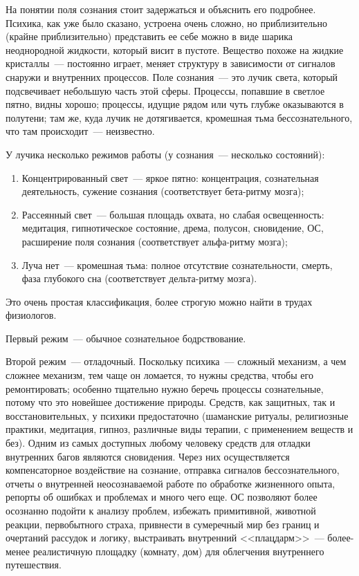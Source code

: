 \documentclass[a4paper,14pt,oneside]{memoir}
\begin{document}
На понятии поля сознания стоит задержаться и объяснить его подробнее. Психика, как уже было сказано, устроена очень сложно, но приблизительно (крайне приблизительно) представить ее себе можно в виде шарика неоднородной жидкости, который висит в пустоте. Вещество похоже на жидкие кристаллы~--- постоянно играет, меняет структуру в зависимости от сигналов снаружи и внутренних процессов. Поле сознания~--- это лучик света, который подсвечивает небольшую часть этой сферы. Процессы, попавшие в светлое пятно, видны хорошо; процессы, идущие рядом или чуть глубже оказываются в полутени; там же, куда лучик не дотягивается, кромешная тьма бессознательного, что там происходит~--- неизвестно.

У лучика несколько режимов работы (у сознания~--- несколько состояний):

\begin{enumerate}
\item Концентрированный свет~--- яркое пятно: концентрация, сознательная деятельность, сужение сознания (соответствует бета-ритму мозга);
\item Рассеянный свет~--- большая площадь охвата, но слабая освещенность: медитация, гипнотическое состояние, дрема, полусон, сновидение, ОС, расширение поля сознания (соответствует альфа-ритму мозга);
\item Луча нет~--- кромешная тьма: полное отсутствие сознательности, смерть, фаза глубокого сна (соответствует дельта-ритму мозга).
\end{enumerate}

Это очень простая классификация, более строгую можно найти в трудах физиологов.

Первый режим~--- обычное сознательное бодрствование.

Второй режим~--- отладочный. Поскольку психика~--- сложный механизм, а чем сложнее механизм, тем чаще он ломается, то нужны средства, чтобы его ремонтировать; особенно тщательно нужно беречь процессы сознательные, потому что это новейшее достижение природы. Средств, как защитных, так и восстановительных, у психики предостаточно (шаманские ритуалы, религиозные практики, медитация, гипноз, различные виды терапии, с применением веществ и без). Одним из самых доступных любому человеку средств для отладки внутренних багов являются сновидения. Через них осуществляется компенсаторное воздействие на сознание, отправка сигналов бессознательного, отчеты о внутренней неосознаваемой работе по обработке жизненного опыта, репорты об ошибках и проблемах и много чего еще. ОС позволяют более осознанно подойти к анализу проблем, избежать примитивной, животной реакции, первобытного страха, привнести в сумеречный мир без границ и очертаний рассудок и логику, выстраивать внутренний <<плацдарм>>~--- более-менее реалистичную площадку (комнату, дом) для облегчения внутреннего путешествия.
\end{document}
